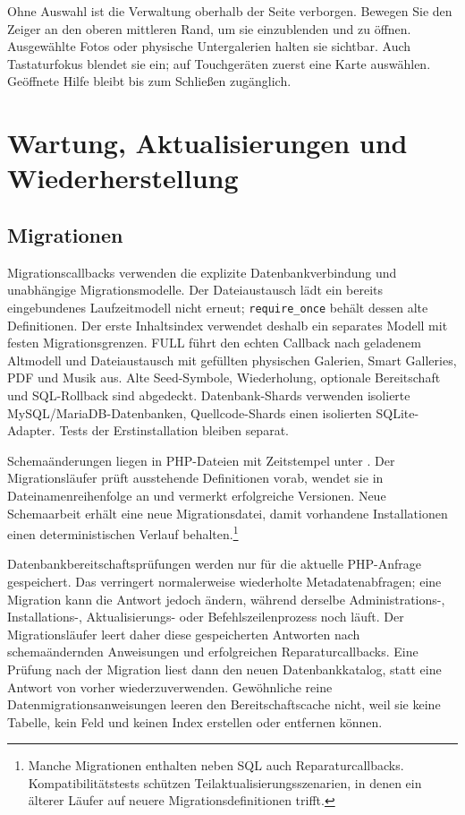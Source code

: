 \documentclass[11pt,a4paper]{article}
\newcommand{\filepath}[1]{\path{#1}}
\newcommand{\codeword}[1]{\nolinkurl{#1}}
\begin{document}
Ohne Auswahl ist die Verwaltung oberhalb der Seite verborgen. Bewegen Sie
den Zeiger an den oberen mittleren Rand, um sie einzublenden und zu öffnen.
Ausgewählte Fotos oder physische Untergalerien halten sie sichtbar. Auch
Tastaturfokus blendet sie ein; auf Touchgeräten zuerst eine Karte auswählen.
Geöffnete Hilfe bleibt bis zum Schließen zugänglich.

\section{Wartung, Aktualisierungen und Wiederherstellung}
\label{sec:maintenance}

\subsection{Migrationen}

Migrationscallbacks verwenden die explizite Datenbankverbindung und unabhängige
Migrationsmodelle. Der Dateiaustausch lädt ein bereits eingebundenes
Laufzeitmodell
nicht erneut; \codeword{require\_once} behält dessen alte Definitionen. Der
erste
Inhaltsindex verwendet deshalb ein separates Modell mit festen
Migrationsgrenzen.
FULL führt den echten Callback nach geladenem Altmodell und Dateiaustausch mit
gefüllten physischen Galerien, Smart Galleries, PDF und Musik aus. Alte
Seed-Symbole, Wiederholung, optionale Bereitschaft und SQL-Rollback sind
abgedeckt.
Datenbank-Shards verwenden isolierte MySQL/MariaDB-Datenbanken, Quellcode-Shards
einen isolierten SQLite-Adapter. Tests der Erstinstallation bleiben separat.

Schemaänderungen liegen in PHP-Dateien mit Zeitstempel unter
\filepath{database/migrations/}. Der Migrationsläufer prüft ausstehende
Definitionen vorab, wendet sie in Dateinamenreihenfolge an und vermerkt
erfolgreiche Versionen. Neue Schemaarbeit erhält eine neue Migrationsdatei,
damit vorhandene Installationen einen deterministischen Verlauf
behalten.\footnote{Manche Migrationen enthalten neben SQL auch
Reparaturcallbacks. Kompatibilitätstests schützen Teilaktualisierungsszenarien,
in denen ein älterer Läufer auf neuere Migrationsdefinitionen trifft.}

Datenbankbereitschaftsprüfungen werden nur für die aktuelle PHP-Anfrage
gespeichert. Das verringert normalerweise wiederholte Metadatenabfragen; eine
Migration kann die Antwort jedoch ändern, während derselbe Administrations-,
Installations-, Aktualisierungs- oder Befehlszeilenprozess noch läuft. Der
Migrationsläufer leert daher diese gespeicherten Antworten nach schemaändernden
Anweisungen und erfolgreichen Reparaturcallbacks. Eine Prüfung nach der
Migration liest dann den neuen Datenbankkatalog, statt eine Antwort von vorher
wiederzuverwenden. Gewöhnliche reine Datenmigrationsanweisungen leeren den
Bereitschaftscache nicht, weil sie keine Tabelle, kein Feld und keinen Index
erstellen oder entfernen können.
\end{document}
